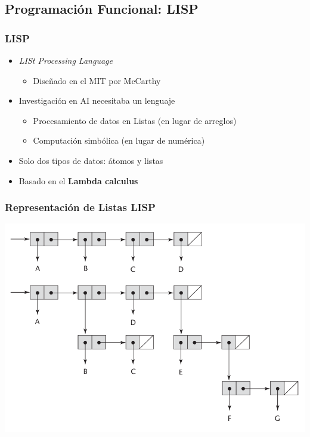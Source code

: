 \documentclass[11pt]{article}
\begin{document}
\subsection*{Programación Funcional: LISP}
\label{sec:orgheadline54}

\subsubsection*{LISP}
\label{sec:orgheadline49}
\begin{itemize}
\item \emph{LISt Processing Language}
\begin{itemize}
\item Diseñado en el MIT por McCarthy
\end{itemize}
\item Investigación en AI necesitaba un lenguaje
\begin{itemize}
\item Procesamiento de datos en Listas (en lugar de arreglos)
\item Computación simbólica (en lugar de numérica)
\end{itemize}
\item Solo dos tipos de datos: átomos y listas
\item Basado en el \textbf{Lambda calculus}
\end{itemize}

\subsubsection*{Representación de Listas LISP}
\label{sec:orgheadline50}

\includegraphics[width=.9\linewidth]{represlistas.png}
\end{document}
